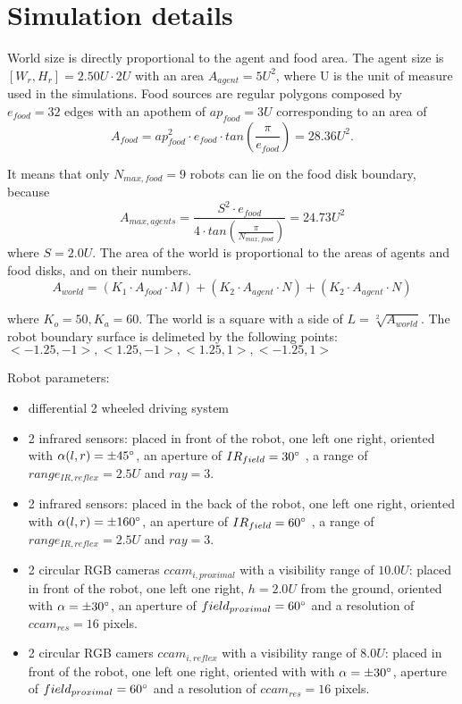 
\section{Simulation details \label{Appendix:simulation}}

World size is directly proportional to the agent and food area. The agent
size is $[W_{r},H_{r}]=2.50 U \cdot 2U$ with an area $A_{agent}=5 U^{2}$, where U is the unit of measure used in the simulations.
Food sources are regular polygons composed by $e_{food}=32$ edges with an apothem of $ap_{food}=3 U$ corresponding to an area of
\begin{equation}
A_{food}=ap_{food}^2 \cdot e_{food} \cdot tan(\frac{\pi}{e_{food}})=28.36 U^2.
\end{equation}

It means that only $N_{max,food}=9$ robots can lie on the food disk boundary, because
\begin{equation}
A_{max,agents}=\frac{S^{2} \cdot e_{food}}{4 \cdot tan(\frac{\pi}{N_{max,food}})}=24.73 U^{2}
\end{equation}
where $S=2.0 U$. The area of the world is proportional to the areas of agents and food disks, and on their numbers.
\begin{equation}
A_{world}=(K_{1} \cdot A_{food} \cdot M) + (K_{2} \cdot A_{agent} \cdot N) + (K_{2} \cdot A_{agent} \cdot N)
\end{equation}

where $K_{o}=50,K_{a}=60$. The world is a square with a side of $L=\sqrt[2]{A_{world}}$.
The robot boundary surface is delimeted by the following points: $<-1.25,-1>,<1.25,-1>,<1.25,1>,<-1.25,1>$

Robot parameters:
\begin{itemize}
\item differential 2 wheeled driving system
\item 2 infrared sensors: placed in front of the robot, one left one right,
oriented with $\alpha(l,r)=\pm45^{\circ}$, an aperture of $IR_{field}=30^{\circ}$ ,
a range of $range_{IR,reflex}=2.5 U$ and $ray=3$.

\item 2 infrared sensors: placed in the back of the robot, one left one right,
oriented with $\alpha(l,r)=\pm160^{\circ}$, an aperture of $IR_{field}=60^{\circ}$ ,
 a range of $range_{IR,reflex}=2.5 U$ and $ray=3$.

\item 2 circular RGB cameras $ccam_{i,proximal}$ with a visibility range of
$10.0 U$: placed in front of the robot, one left one right, $h=2.0 U$
from the ground, oriented with $\alpha=\pm30^{\circ}$, an aperture of
$field_{proximal}=60^{\circ}$  and a resolution of $ccam_{res}=16$ pixels.
\item 2 circular RGB camers $ccam_{i,reflex}$ with a visibility range of
$8.0 U$: placed in front of the robot, one left one right,
oriented with with $\alpha=\pm30^{\circ}$, aperture of $field_{proximal}=60^{\circ}$
and a resolution of $ccam_{res}=16$ pixels.
\end{itemize}


